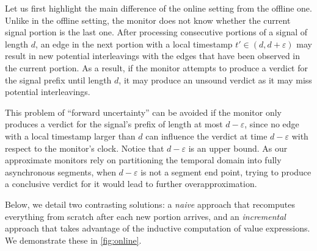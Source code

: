 Let us first highlight the main difference of the online setting from the offline one.
Unlike in the offline setting, the monitor does not know whether the current signal portion is the last one.
After processing consecutive portions of a signal of length $d$, an edge in the next portion with a local timestamp $t' \in (d, d+\varepsilon)$ may result in new potential interleavings with the edges that have been observed in the current portion.
As a result, if the monitor attempts to produce a verdict for the signal prefix until length $d$, it may produce an unsound verdict as it may miss potential interleavings.

This problem of ``forward uncertainty'' can be avoided if the monitor only produces a verdict for the signal's prefix of length at most $d-\varepsilon$, since no edge with a local timestamp larger than $d$ can influence the verdict at time $d-\varepsilon$ with respect to the monitor's clock.
Notice that $d-\varepsilon$ is an upper bound.
As our approximate monitors rely on partitioning the temporal domain into fully asynchronous segments, when $d-\varepsilon$ is not a segment end point, trying to produce a conclusive verdict for it would lead to further overapproximation.

Below, we detail two contrasting solutions: a \emph{naive} approach that recomputes everything from scratch after each new portion arrives, and an \emph{incremental} approach that takes advantage of the inductive computation of value expressions.
We demonstrate these in \cref{fig:online}.

